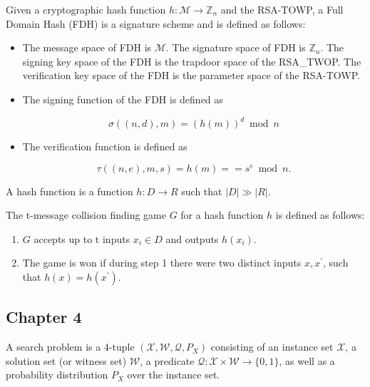 \documentclass[a4paper,german]{article}
\newenvironment{customdef}[1]{\renewcommand\theinnercustomdef{#1}\innercustomdef}{\endinnercustomdef}
\begin{document}
\begin{customdef}{FDH}
	Given a cryptographic hash function $h: \mathcal{M} \rightarrow \mathbb{Z}_n$ and the RSA-TOWP, a Full Domain Hash (FDH) is a signature scheme and is defined as follows:

	\begin{itemize}

		\item  The message space of FDH is $\mathcal{M}$. The signature space of FDH is $\mathbb{Z}_n$. The signing key space of the FDH is the trapdoor space of the RSA\_TWOP. The verification key space of the FDH is the parameter space of the RSA-TOWP.
		\item  The signing function of the FDH is defined as

			\[
				\sigma((n, d), m) = (h(m))^d \bmod n
			\]
		\item  The verification function is defined as

			\[
				\tau((n, e), m, s) = h(m) == s^e \bmod n
			.\]

	\end{itemize}
\end{customdef}

\begin{customdef}{3.19}
	A hash function is a function $h: D \rightarrow R$ such that $|D| \gg |R|$.
\end{customdef}

\begin{customdef}{3.20}
	The t-message collision finding game $G$ for a hash function $h$ is defined as follows:

	\begin{enumerate}

		\item  $G$ accepts up to t inputs $x_i \in D$ and outputs $h(x_i)$.
		\item  The game is won if during step 1 there were two distinct inputs $x, x^\prime$, such that $h(x) = h(x^\prime)$.

	\end{enumerate}
\end{customdef}

\subsection*{Chapter 4}

\begin{customdef}{4.1}
  A search problem is a 4-tuple $(\mathcal{X}, \mathcal{W}, \mathcal{Q}, P_ X )$ consisting of an instance set $\mathcal{X}$, a solution set (or witness set) $\mathcal{W}$, a predicate $\mathcal{Q} : \mathcal{X} \times \mathcal{W} \rightarrow \{0, 1\}$, as
well as a probability distribution $P_X$ over the instance set.
\end{customdef}
\end{document}
